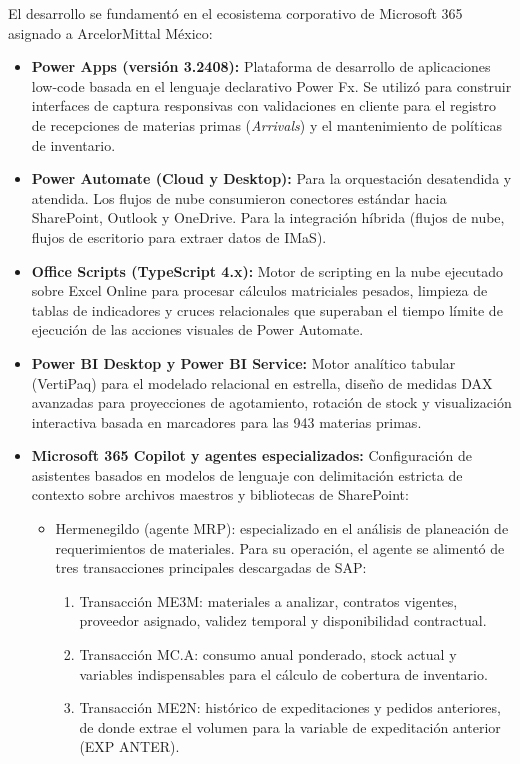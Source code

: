 El desarrollo se fundamentó en el ecosistema corporativo de Microsoft 365 asignado a ArcelorMittal México:
\begin{itemize}
    \item \textbf{Power Apps (versión 3.2408):} Plataforma de desarrollo de aplicaciones low-code basada en el lenguaje declarativo Power Fx. Se utilizó para construir interfaces de captura responsivas con validaciones en cliente para el registro de recepciones de materias primas (\emph{Arrivals}) y el mantenimiento de políticas de inventario.
    \item \textbf{Power Automate (Cloud y Desktop):} Para la orquestación desatendida y atendida. Los flujos de nube consumieron conectores estándar hacia SharePoint, Outlook y OneDrive. Para la integración híbrida (flujos de nube, flujos de escritorio para extraer datos de IMaS).
    \item \textbf{Office Scripts (TypeScript 4.x):} Motor de scripting en la nube ejecutado sobre Excel Online para procesar cálculos matriciales pesados, limpieza de tablas de indicadores y cruces relacionales que superaban el tiempo límite de ejecución de las acciones visuales de Power Automate.
    \item \textbf{Power BI Desktop y Power BI Service:} Motor analítico tabular (VertiPaq) para el modelado relacional en estrella, diseño de medidas DAX avanzadas para proyecciones de agotamiento, rotación de stock y visualización interactiva basada en marcadores para las 943 materias primas.
    \item \textbf{Microsoft 365 Copilot y agentes especializados:} Configuración de asistentes basados en modelos de lenguaje con delimitación estricta de contexto sobre archivos maestros y bibliotecas de SharePoint:
    \begin{itemize}
        \item Hermenegildo (agente MRP): especializado en el análisis de planeación de requerimientos de materiales. Para su operación, el agente se alimentó de tres transacciones principales descargadas de SAP:
        \begin{enumerate}
            \item Transacción ME3M: materiales a analizar, contratos vigentes, proveedor asignado, validez temporal y disponibilidad contractual.
            \item Transacción MC.A: consumo anual ponderado, stock actual y variables indispensables para el cálculo de cobertura de inventario.
            \item Transacción ME2N: histórico de expeditaciones y pedidos anteriores, de donde extrae el volumen para la variable de expeditación anterior (EXP ANTER).

\end{enumerate}
\end{itemize}
\end{itemize}
